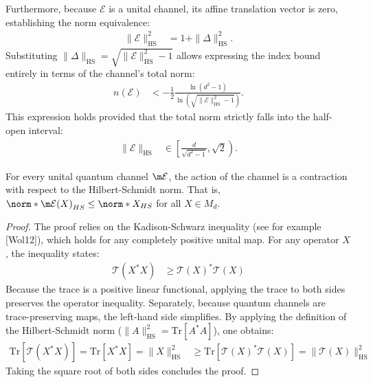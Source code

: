 Furthermore, because $\mathcal{E}$ is a unital channel, its affine translation vector is zero, establishing the norm equivalence:
\begin{align*}
    \|\mathcal{E}\|_{\text{HS}}^2 &= 1 + \|\Delta\|_{\text{HS}}^2.
\end{align*}
Substituting $\|\Delta\|_{\text{HS}} = \sqrt{\|\mathcal{E}\|_{\text{HS}}^2 - 1}$ allows expressing the index bound entirely in terms of the channel's total norm:
\begin{align*}
    n(\mathcal{E}) &< - \frac{1}{2} \frac{\ln(d^2 - 1)}{\ln \left( \sqrt{\|\mathcal{E}\|_{\text{HS}}^2 - 1} \right)}.
\end{align*}
This expression holds provided that the total norm strictly falls into the half-open interval:
\begin{align*}
    \|\mathcal{E}\|_{\text{HS}} &\in \left[ \frac{d}{\sqrt{d^2 - 1}}, \sqrt{2} \right).
\end{align*}

\begin{prop}
For every unital quantum channel $\mathcal{\m E}$, the action of the channel is a contraction with respect to the Hilbert-Schmidt norm. That is, $
\norm*{\mathcal{\m E}(X)}_{HS} \leq \norm*{X}_{HS}$ for all $X \in M_d$.
\end{prop}

\begin{proof}
The proof relies on the Kadison-Schwarz inequality (see for example [Wol12]), which holds for any completely positive unital map. For any operator $X$, the inequality states:
\begin{align*}
    \mathcal{T}(X^* X) &\ge \mathcal{T}(X)^* \mathcal{T}(X)
\end{align*}
Because the trace is a positive linear functional, applying the trace to both sides preserves the operator inequality. Separately, because quantum channels are trace-preserving maps, the left-hand side simplifies. By applying the definition of the Hilbert-Schmidt norm ($\|A\|_{\text{HS}}^2 = \text{Tr}[A^* A]$), one obtains:
\begin{align*}
    \text{Tr}[\mathcal{T}(X^* X)] = \text{Tr}[X^* X] = \|X\|_{\text{HS}}^2 &\ge \text{Tr}[\mathcal{T}(X)^* \mathcal{T}(X)] = \|\mathcal{T}(X)\|_{\text{HS}}^2
\end{align*}
Taking the square root of both sides concludes the proof.
\end{proof}

